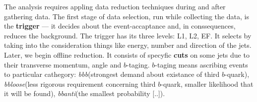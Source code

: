 The analysis requires appling data reduction techniques during and after gathering data. The first
stage of data selection, run while collecting the data, is the \textbf{trigger} --- it decides about the event-accaptance 
and, in conssequences, reduces the background. The trigger has its three levels: L1, L2, EF. 
It selects by taking into the consideration things like energy, number
and direction of the jets.\\
Later, we begin offline reduction. It consists of specyfic \textbf{cuts} on some jets due to their 
transverse momentum, angle and $b$-taging. $b$-taging means ascribing events to particular cathegory:
\textit{bbb}(strongest demand about existance of third $b$-quark), \textit{bbloose}(less rigorous requirement concerning 
third $b$-quark, smaller likelihood that it will be found), \textit{bbanti}(the smallest probability [..]).